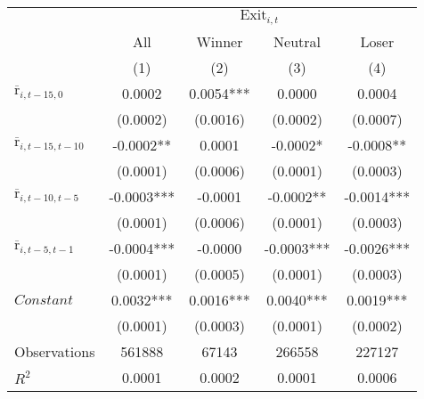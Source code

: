 \begin{tabular}{lcccc}
\toprule
 & \multicolumn{4}{c}{$\text{Exit}_{i,t}$} \\
\cmidrule{2-5}
 & All & Winner & Neutral & Loser\\
 & (1) & (2) & (3) & (4) \\
\midrule
$\overline{\text{r}}_{i,t-15,0}$ & 0.0002 & 0.0054*** & 0.0000 & 0.0004 \\
 & (0.0002) & (0.0016) & (0.0002) & (0.0007) \\
$\overline{\text{r}}_{i,t-15,t-10}$ & -0.0002** & 0.0001 & -0.0002* & -0.0008** \\
 & (0.0001) & (0.0006) & (0.0001) & (0.0003) \\
$\overline{\text{r}}_{i,t-10,t-5}$ & -0.0003*** & -0.0001 & -0.0002** & -0.0014*** \\
 & (0.0001) & (0.0006) & (0.0001) & (0.0003) \\
$\overline{\text{r}}_{i,t-5,t-1}$ & -0.0004*** & -0.0000 & -0.0003*** & -0.0026*** \\
 & (0.0001) & (0.0005) & (0.0001) & (0.0003) \\
$Constant$ & 0.0032*** & 0.0016*** & 0.0040*** & 0.0019*** \\
 & (0.0001) & (0.0003) & (0.0001) & (0.0002) \\
\midrule
Observations & 561888 & 67143 & 266558 & 227127 \\
$R^2$ & 0.0001 & 0.0002 & 0.0001 & 0.0006 \\
\bottomrule
\end{tabular}